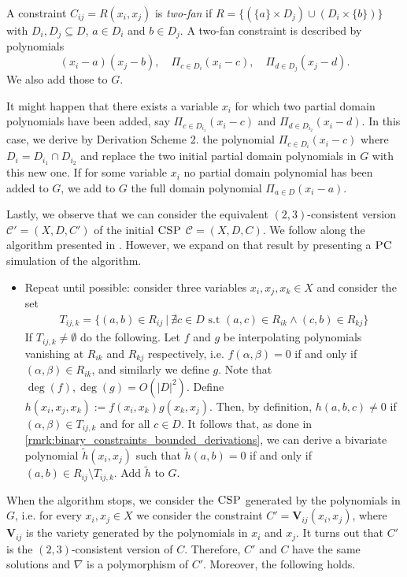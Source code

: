\documentclass[11pt]{article}
\newcommand{\Cc}{\mathcal{C}}
\newcommand{\CSP}{\textsc{CSP}}
\newcommand{\PC}{\textsc{PC}}
\newcommand{\1}{\textbf{1}}
\begin{document}
A constraint $C_{ij} = R(x_i, x_j)$ is \textit{two-fan} if $R = \{(\{a\} \times D_j) \cup (D_i \times \{b\})\}$ with $D_i, D_j \subseteq D$, $a \in D_i$ and $b \in D_j$. A two-fan constraint is described by polynomials
\begin{equation*}
    (x_i - a)(x_j - b), \quad \Pi_{c \in D_i} (x_i - c), \quad \Pi_{d \in D_j} (x_j - d).
\end{equation*}
We also add those to $G$. 

It might happen that there exists a variable $x_i$ for which two partial domain polynomials have been added, say $\Pi_{c \in D_{i_1}} (x_i - c)$ and $\Pi_{d \in D_{i_2}} (x_i - d)$. In this case, we derive by Derivation Scheme 2. the polynomial $\Pi_{c \in D_i} (x_i - c)$ where $D_i = D_{i_1} \cap D_{i_2}$ and replace the two initial partial domain polynomials in $G$ with this new one. If for some variable $x_i$ no partial domain polynomial has been added to $G$, we add to $G$ the full domain polynomial $\Pi_{a \in D} (x_i - a)$.

Lastly, we observe that we can consider the equivalent $(2,3)$-consistent version $\Cc' = (X, D, C')$ of the initial $\CSP$ $\Cc = (X, D, C)$. We follow along the algorithm presented in \cite{BulatovRSTOC22}. However, we expand on that result by presenting a $\PC$ simulation of the algorithm.
\begin{itemize}
    \item Repeat until possible: consider three variables $x_i, x_j, x_k \in X$ and consider the set
    \begin{align*}
        T_{ij,k} = \{(a,b) \in R_{ij} \ | \ \nexists c \in D \text{ s.t } (a,c) \in R_{ik} \wedge (c,b) \in R_{kj} \} 
    \end{align*}
    If $T_{ij,k} \neq \emptyset$ do the following. Let $f$ and $g$ be interpolating polynomials vanishing at $R_{ik}$ and $R_{kj}$ respectively, i.e. $f(\alpha, \beta) = 0$ if and only if $(\alpha, \beta) \in R_{ik}$, and similarly we define $g$. Note that $\deg(f), \deg(g) = O(|D|^2)$. Define $h(x_i, x_j, x_k) := f(x_i, x_k)g(x_k, x_j)$. Then, by definition, $h(a,b,c) \neq 0$ if $(\alpha,\beta) \in T_{ij,k}$ and for all $c \in D$. It follows that, as done in \cref{rmrk:binary_constraints_bounded_derivations}, we can derive a bivariate polynomial $\tilde{h}(x_i,x_j)$ such that $\tilde{h}(a,b) = 0$ if and only if $(a,b) \in R_{ij} \setminus T_{ij,k}$. Add $\tilde{h}$ to $G$.
\end{itemize}
When the algorithm stops, we consider the $\CSP$ generated by the polynomials in $G$, i.e. for every $x_i, x_j \in X$ we consider the constraint $C' = \mathbf{V}_{ij}(x_i, x_j)$, where $\mathbf{V}_{ij}$ is the variety generated by the polynomials in $x_i$ and $x_j$. It turns out that $C'$ is the $(2,3)$-consistent version of $C$. Therefore, $C'$ and $C$ have the same solutions and $\nabla$ is a polymorphism of $C'$. Moreover, the following holds.
\end{document}
